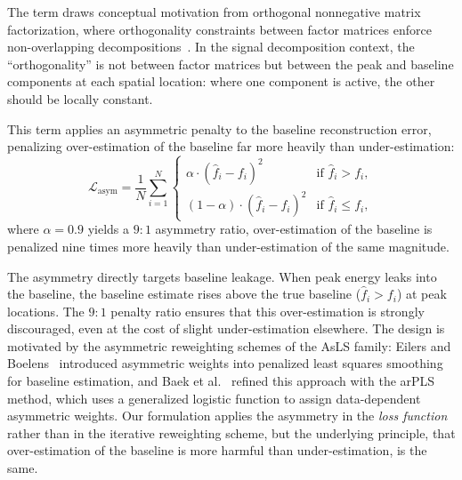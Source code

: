 The term draws conceptual motivation from orthogonal nonnegative matrix factorization, where orthogonality constraints between factor matrices enforce non-overlapping decompositions~\cite{ding2006orthonmf, pompili2014onmf}. In the signal decomposition context, the ``orthogonality'' is not between factor matrices but between the peak and baseline components at each spatial location: where one component is active, the other should be locally constant.

This term applies an asymmetric penalty to the baseline reconstruction error, penalizing over-estimation of the baseline far more heavily than under-estimation:
\begin{equation}
    \mathcal{L}_{\text{asym}} = \frac{1}{N} \sum_{i=1}^{N}
    \begin{cases}
        \alpha \cdot (\hat{f}_i - f_i)^2 & \text{if } \hat{f}_i > f_i, \\
        (1 - \alpha) \cdot (\hat{f}_i - f_i)^2 & \text{if } \hat{f}_i \leq f_i,
    \end{cases}
    \label{eq:asym_loss}
\end{equation}
where $\alpha = 0.9$ yields a $9{:}1$ asymmetry ratio, over-estimation of the baseline is penalized nine times more heavily than under-estimation of the same magnitude.

The asymmetry directly targets baseline leakage. When peak energy leaks into the baseline, the baseline estimate rises above the true baseline ($\hat{f}_i > f_i$) at peak locations. The $9{:}1$ penalty ratio ensures that this over-estimation is strongly discouraged, even at the cost of slight under-estimation elsewhere. The design is motivated by the asymmetric reweighting schemes of the AsLS family: Eilers and Boelens~\cite{eilers2005baseline} introduced asymmetric weights into penalized least squares smoothing for baseline estimation, and Baek et al.~\cite{baek2015arpls} refined this approach with the arPLS method, which uses a generalized logistic function to assign data-dependent asymmetric weights. Our formulation applies the asymmetry in the \emph{loss function} rather than in the iterative reweighting scheme, but the underlying principle, that over-estimation of the baseline is more harmful than under-estimation, is the same.

